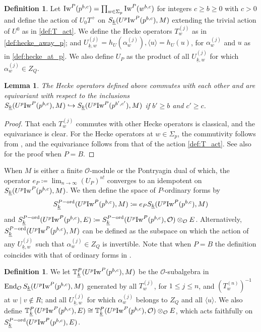 \documentclass[leqno]{amsart}
\newcommand{\wt}[1]{\underline{ #1 }}
\newcommand{\TT}{\mathbb{T}} %
\newcommand{\Iw}{\textnormal{Iw}}
\newcommand{\ord}{\textnormal{ord}}
\newcommand{\oo}{\mathcal{O}} %
\DeclareMathOperator{\End}{End}
\newtheorem{lem}[thm]{Lemma}
\theoremstyle{definition}
\newtheorem{defn}[thm]{Definition}
\theoremstyle{remark}
\begin{document}
\begin{defn}\label{def:hecke}
Let $\Iw^P(p^{b,c})=\prod_{w\in \Sigma_p}\Iw^P(w^{b,c})$
for integers  $c\geq b\geq 0$ with $c>0$
and define the action of $U_0T^+$ 
on $S_{\wt{k}}(U^p\Iw^P(p^{b,c}),M)$
extending the trivial action of $U^0$ as in \eqref{def:T_act}.
We define the Hecke operators $T_w^{(j)}$
as in \eqref{def:hecke_away_p}; and 
$U_{\wt{k},w}^{(j)}=h_U(\alpha_w^{(j)}),\langle u\rangle=h_U(u)$,
for $\alpha_w^{(j)}$ and $u$ as in \eqref{def:hecke_at_p}.
We also define $U_P$
as the product of all  $U_{\wt{k},w}^{(j)}$
for which $\alpha_w^{(j)}\in Z_Q$.
\end{defn}


\begin{lem}
The Hecke operators defined above commutes with each other
and are equivariant with respect to the inclusions
$ S_{\wt{k}}(U^p\Iw^P(p^{b,c}),M)\hookrightarrow
S_{\wt{k}}(U^p\Iw^P(p^{b',c'}),M)$
if $b'\geq b$ and $c'\geq c$.
\end{lem}
\begin{proof}
That each $T_w^{(j)}$ commutes with other Hecke operators is classical,
and the equivariance is clear.
For the Hecke operators at  $w\in \Sigma_p$,
the commutivity follows from \cite[Lem 3.1.4]{emeI},
and the equivariance follows from 
that of the action \eqref{def:T_act}.
See also \cite[Lem 2.10]{ger} for the proof when $P=B$.
\end{proof}


When $M$ is either a finite  $\oo$-module
or the Pontryagin dual of which,
the operator $e_P\coloneqq\lim_{n\to \infty}(U_P)^{n!}$
converges to an idempotent 
on $S_{\wt{k}}(U^p\Iw^P(p^{b,c}),M)$.
We then define the space of $P$-ordinary forms by
\[
	S_{\wt{k}}^{P-\ord}(U^p\Iw^P(p^{b,c}),M)\coloneqq
	e_PS_{\wt{k}}(U^p\Iw^P(p^{b,c}),M)
\]
and $S_{\wt{k}}^{P-\ord}(U^p\Iw^P(p^{b,c}),E)\coloneqq 
S_{\wt{k}}^{P-\ord}(U^p\Iw^P(p^{b,c}),\oo)\otimes_{\oo}E$.
Alternatively,
$S_{\wt{k}}^{P-\ord}(U^p\Iw^P(p^{b,c}),M)$
can be defined as the subspace on which the action of
any  $U_{\wt{k},w}^{(j)}$ such that 
$\alpha_w^{(j)}\in Z_Q$ is invertible.
Note that when $P=B$ the definition coincides with 
that of ordinary forms in \cite[Def 2.13]{ger}.

\begin{defn}\label{def:ord_hecke}
	We let $\TT^P_{\wt{k}}(U^p\Iw^P(p^{b,c}),M)$
	be the $\oo$-subalgebra in 
	$\End_{\oo}S_{\wt{k}}(U^p\Iw^P(p^{b,c}),M)$
	generated by all
	$T_w^{(j)}$, for $1\leq j\leq n$,
	and $(T_w^{(n)})^{-1}$ at $w\mid v\notin R$;
	and all $U_{\wt{k},w}^{(j)}$ 
	for which $\alpha_w^{(j)}$  belongs to  $Z_Q$
	and all $\langle u\rangle$.
	We also define 
	$\TT^P_{\wt{k}}(U^p\Iw^P(p^{b,c}),E)\cong
	\TT^P_{\wt{k}}(U^p\Iw^P(p^{b,c}),\oo)\otimes_{\oo}E$,
	which acts faithfully on 
	$S_{\wt{k}}^{P-\ord}(U^p\Iw^P(p^{b,c}),E)$.
\end{defn}
\end{document}
